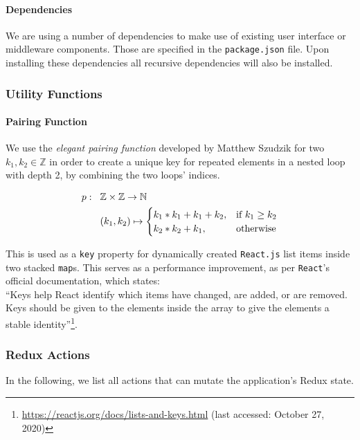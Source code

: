 \paragraph{Dependencies}
We are using a number of dependencies to make use of existing user interface or middleware components. Those are specified in the \texttt{package.json} file. Upon installing these dependencies all recursive dependencies will also be installed.

\subsubsection{Utility Functions}
\paragraph{Pairing Function}
We use the \textit{elegant pairing function} developed by Matthew Szudzik \cite{szudzik2006elegant} for two $k_1,k_2 \in \mathbb{Z}$ in order to create a unique key for repeated elements in a nested loop with depth 2, by combining the two loops' indices.

\begin{equation}
    \begin{aligned}
        p: \hspace{0.3cm} & \mathbb{Z} \times \mathbb{Z} \rightarrow \mathbb{N}\\
        & (k_1,k_2) \mapsto
        \begin{cases}
        k_1 * k_1 + k_1 + k_2, & \text{if}\ k_1 \geq k_2 \\
        k_2 * k_2 + k_1, & \text{otherwise}
        \end{cases}
    \end{aligned}
\end{equation}

This is used as a \texttt{key} property for dynamically created \texttt{React.js} list items inside two stacked \texttt{map}s. This serves as a performance improvement, as per \texttt{React}'s official documentation, which states:\\
``Keys help React identify which items have changed, are added, or are removed. Keys should be given to the elements inside the array to give the elements a stable identity''\footnote{\url{https://reactjs.org/docs/lists-and-keys.html} (last accessed: October 27, 2020)}.

\subsubsection{Redux Actions}
In the following, we list all actions that can mutate the application's Redux state.\newpage

